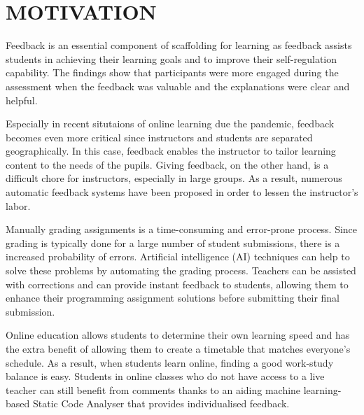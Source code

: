 \section{MOTIVATION} %
Feedback is an essential component of scaffolding for learning as
feedback assists students in achieving their learning goals and to
improve their self-regulation capability. The findings show that
participants were more engaged during the assessment when the feedback
was valuable and the explanations were clear and helpful.

Especially in recent situtaions of online learning due the pandemic,
feedback becomes even more critical since instructors and students are
separated geographically. In this case, feedback enables the
instructor to tailor learning content to the needs of the
pupils. Giving feedback, on the other hand, is a difficult chore for
instructors, especially in large groups. As a result, numerous
automatic feedback systems have been proposed in order to lessen the
instructor's labor.

Manually grading assignments is a time-consuming and error-prone process. Since grading is typically done for a large number of
student submissions, there is a increased probability of errors. Artificial intelligence (AI) techniques can help to solve these problems by automating the grading process. Teachers can be assisted with corrections and can provide instant feedback to students, allowing them to enhance their programming assignment solutions before submitting their final submission.

\iffalse
Online education in general is less expensive and more affordable than
traditional classroom education. There is also often a wide range of
payment options that let you pay in installments or per class. This
allows for financially disadvantaged students to upskill themselves to
open avenues for better career opportunities. Money can also be saved
from the commute and class materials which are often available for
free. In other words, the monetary investment is less, but the results
can be comparable to other options.
\fi

Online education allows students to determine their own learning speed and has the extra benefit of allowing them to create a timetable that matches everyone's schedule. As a result, when students learn online, finding a good work-study balance is easy. Students in online classes who do not have access to a live teacher can still benefit from comments thanks to an aiding machine learning-based Static Code Analyser that provides individualised feedback.


